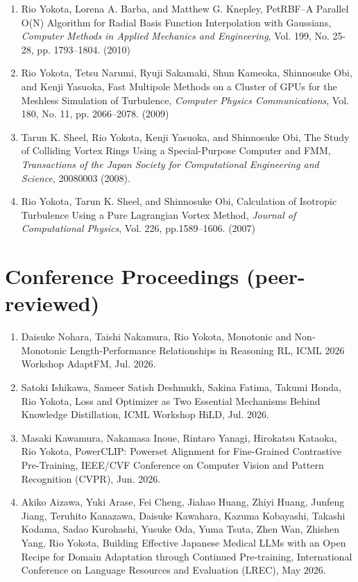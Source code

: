 \documentclass[margin,line]{cv}
\begin{document}
\begin{resume}
\begin{enumerate}
\item Rio Yokota, Lorena A. Barba, and Matthew G. Knepley, PetRBF--A Parallel O(N) Algorithm for Radial Basis Function Interpolation with Gaussians, {\it Computer Methods in Applied Mechanics and Engineering}, Vol. 199, No. 25-28, pp. 1793--1804. (2010)

\item Rio Yokota, Tetsu Narumi, Ryuji Sakamaki, Shun Kameoka, Shinnosuke Obi, and Kenji Yasuoka, Fast Multipole Methods on a Cluster of GPUs for the Meshless Simulation of Turbulence, {\it Computer Physics Communications}, Vol. 180, No. 11, pp. 2066--2078. (2009)

\item Tarun K. Sheel, Rio Yokota, Kenji Yasuoka, and Shinnosuke Obi, The Study of Colliding Vortex Rings Using a Special-Purpose Computer and FMM, {\it Transactions of the Japan Society for Computational Engineering and Science}, 20080003 (2008).

\item Rio Yokota, Tarun K. Sheel, and Shinnosuke Obi, Calculation of Isotropic Turbulence Using a Pure Lagrangian Vortex Method, {\it Journal of Computational Physics}, Vol. 226, pp.1589--1606. (2007)
\end{enumerate}

\section{\sc Conference Proceedings (peer-reviewed)}
\begin{enumerate}
\item Daisuke Nohara, Taishi Nakamura, Rio Yokota, Monotonic and Non-Monotonic Length-Performance Relationships in Reasoning RL, ICML 2026 Workshop AdaptFM, Jul. 2026.

\item Satoki Ishikawa, Sameer Satish Deshmukh, Sakina Fatima, Takumi Honda, Rio Yokota, Loss and Optimizer as Two Essential Mechanisms Behind Knowledge Distillation, ICML Workshop HiLD, Jul. 2026.

\item Masaki Kawamura, Nakamasa Inoue, Rintaro Yanagi, Hirokatsu Kataoka, Rio Yokota, PowerCLIP: Powerset Alignment for Fine-Grained Contrastive Pre-Training, IEEE/CVF Conference on Computer Vision and Pattern Recognition (CVPR), Jun. 2026.

\item Akiko Aizawa, Yuki Arase, Fei Cheng, Jiahao Huang, Zhiyi Huang, Junfeng Jiang, Teruhito Kanazawa, Daisuke Kawahara, Kazuma Kobayashi, Takashi Kodama, Sadao Kurohashi, Yusuke Oda, Yuma Tsuta, Zhen Wan, Zhishen Yang, Rio Yokota, Building Effective Japanese Medical LLMs with an Open Recipe for Domain Adaptation through Continued Pre-training, International Conference on Language Resources and Evaluation (LREC), May 2026.


\end{enumerate}
\end{resume}
\end{document}
